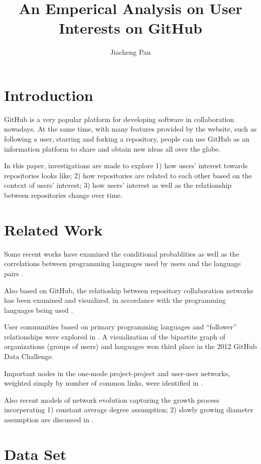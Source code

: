 \documentclass[11pt]{article}
\title{An Emperical Analysis on User Interests on GitHub}
\author{Jiacheng Pan}
\begin{document}
\maketitle

\section{Introduction}
GitHub is a very popular platform for developing software in collaboration nowadays. At the same time, with many features provided by the website, such as following a user, starring and forking a repository, people can use GitHub as an information platform to share and obtain new ideas all over the globe.

In this paper, investigations are made to explore 1) how users' interest towards repositories looks like; 2) how repositories are related to each other based on the context of users' interest; 3) how users' interest as well as the relationship between repositories change over time.

\section{Related Work}
Some recent works have examined the conditional probablities as well as the correlations between programming languages used by users and the language pairs \cite{doll12,shah13}.

Also based on GitHub, the relatioship between repository collaboration networks has been examined and visualized, in accordance with the programming languages being used \cite{ford13,marrama}.

User communities based on primary programming languages and ``follower'' relationships were explored in \cite{cuny10,weber12}.  A visualization of the bipartite graph of organizations (groups of users) and languages \cite{rodrigues12} won third place in the 2012 GitHub Data Challenge.  

Important nodes in the one-mode project-project and user-user networks, weighted simply by number of common links, were identified in \cite{thung2013}.

Also recent models of network evolution capturing the growth process incorperating 1) constant average degree assumption; 2) slowly growing diameter assumption are discussed in \cite{albert1999internet,broder2000graphStructure,Watts-Colective-1998}.

\section{Data Set}
\end{document}
